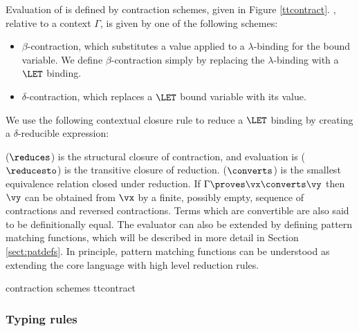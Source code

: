 Evaluation of \TT{} is defined by contraction schemes, given in Figure
\ref{ttcontract}. , relative to a context $\Gamma$, is given
by one of the following schemes:

\begin{itemize}
\item $\beta$-contraction, which substitutes a value applied to a $\lambda$-binding for
the bound variable. We define $\beta$-contraction simply by replacing the $\lambda$-binding
with a $\LET$ binding.
\item $\delta$-contraction, which replaces a $\LET$ bound variable with its value.
\end{itemize}

\noindent
We use the following contextual closure rule to reduce a $\LET$ binding by creating
a $\delta$-reducible expression:


 ($\reduces$) is the structural closure of contraction, and evaluation
is ($\reducesto$) is the transitive closure of reduction.  ($\converts$)
is the smallest equivalence relation closed under reduction. If $\Gamma\proves\vx\converts\vy$
then $\vy$ can be obtained from $\vx$ by a finite, possibly empty, sequence of
contractions and reversed contractions. Terms which are convertible are also said to
be definitionally equal.
The evaluator can also be extended by defining pattern matching functions, which
will be described in more detail in Section \ref{sect:patdefs}. In principle, pattern
matching functions can be understood as extending the core language with high level
reduction rules.

{\TT{} contraction schemes}
{ttcontract}



\subsubsection{Typing rules}

\label{sect:typerules}

